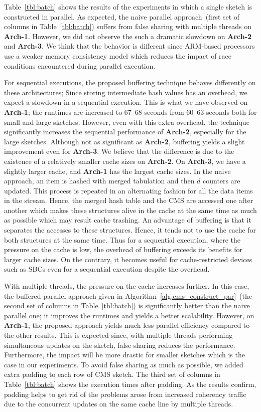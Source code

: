 \documentclass[10pt, review=true,sigconf]{acmart}
\begin{document}
Table~\ref{tbl:batch} shows the results of the experiments in which a single sketch is constructed in parallel. As expected, the naive parallel approach~(first set of columns in Table~\ref{tbl:batch}) suffers from false sharing with multiple threads on {\bf Arch-1}. However, we did not observe the such a dramatic slowdown on {\bf Arch-2} and {\bf Arch-3}. We think that the behavior is different since ARM-based processors use a weaker memory consistency model which reduces the impact of race conditions encountered during parallel execution. 

For sequential executions, the proposed buffering technique behaves differently on these architectures; Since storing intermediate hash values has an overhead, we expect a slowdown in a sequential execution. This is what we have observed on {\bf Arch-1}; the runtimes are increased to 67--68 seconds from 60--63 seconds both for small and large sketches. 
However, even with this extra overhead, the technique significantly increases the sequential performance of {\bf Arch-2}, especially for the large sketches. 
Although not as significant as {\bf Arch-2}, buffering yields a slight improvement even for {\bf Arch-3}. 
We believe that the difference is due to the existence of a relatively smaller cache sizes on {\bf Arch-2}. On {\bf Arch-3}, we have a slightly larger cache, and {\bf Arch-1} has the largest cache sizes. In the naive approach, an item is hashed with merged tabulation and then $d$ counters are updated. This process is repeated in an alternating fashion for all the data items in the stream. Hence, the merged hash table and the CMS are accessed one after another which makes these structures alive in the cache at the same time as much as possible which may result cache trashing.  An advantage of buffering is that it separates the accesses to these structures. Hence, it tends not to use the cache for both structures at the same time. Thus for a sequential execution, where the pressure on the cache is low, the overhead of buffering exceeds its benefits for larger cache sizes. On the contrary, it becomes useful for cache-restricted devices such as SBCs even for a sequential execution despite the overhead. 

With multiple threads, the pressure on the cache increases further. In this case, the buffered parallel approach given in Algorithm~\ref{alg:cms_construct_par}~(the second set of columns in Table~\ref{tbl:batch}) is significantly better than the naive parallel one; it improves the runtimes and yields a better scalability. However, on {\bf Arch-1}, the proposed approach yields much less parallel efficiency compared to the other results. This is expected since, with multiple threads performing simultaneous updates on the sketch, false sharing reduces the performance. Furthermore, the impact will be more drastic for smaller sketches which is the case in our experiments. To avoid false sharing as much as possible, we added extra padding to each row of CMS sketch. The third set of columns in Table~\ref{tbl:batch} shows the execution times after padding. As the results confirm, padding helps to get rid of the problems arose from increased coherency traffic due to the concurrent updates on the same cache line by multiple threads. 
\end{document}
